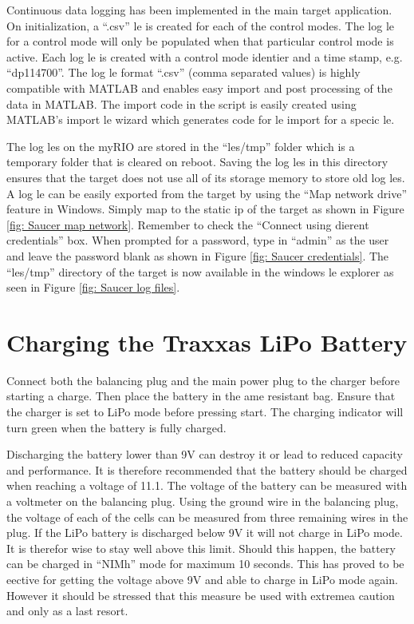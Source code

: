 \documentclass[a4paper,twoside,english]{report}
\begin{document}
Continuous data logging has been implemented in the main target application.
On initialization, a ``.csv'' le is created for each of the control
modes. The log le for a control mode will only be populated when that
particular control mode is active. Each log le is created with a control
mode identier and a time stamp, e.g. ``dp114700''. The log le format
``.csv'' (comma separated values) is highly compatible with MATLAB
and enables easy import and post processing of the data in MATLAB.
The import code in the script is easily created using MATLAB's import
le wizard which generates code for le import for a specic le.

The log les on the myRIO are stored in the ``les/tmp'' folder which
is a temporary folder that is cleared on reboot. Saving the log les
in this directory ensures that the target does not use all of its
storage memory to store old log les. A log le can be easily exported
from the target by using the ``Map network drive'' feature in Windows.
Simply map to the static ip of the target as shown in Figure \ref{fig: Saucer map network}.
Remember to check the ``Connect using dierent credentials'' box.
When prompted for a password, type in ``admin'' as the user and
leave the password blank as shown in Figure \ref{fig: Saucer credentials}.
The ``les/tmp'' directory of the target is now available in the
windows le explorer as seen in Figure \ref{fig: Saucer log files}.

\section{Charging the Traxxas LiPo Battery}

Connect both the balancing plug and the main power plug to the charger
before starting a charge. Then place the battery in the ame resistant
bag. Ensure that the charger is set to LiPo mode before pressing start.
The charging indicator will turn green when the battery is fully charged.

Discharging the battery lower than 9V can destroy it or lead to reduced
capacity and performance. It is therefore recommended that the battery
should be charged when reaching a voltage of 11.1. The voltage of
the battery can be measured with a voltmeter on the balancing plug.
Using the ground wire in the balancing plug, the voltage of each of
the cells can be measured from three remaining wires in the plug.
If the LiPo battery is discharged below 9V it will not charge in LiPo
mode. It is therefor wise to stay well above this limit. Should this
happen, the battery can be charged in ``NIMh'' mode for maximum
10 seconds. This has proved to be eective for getting the voltage
above 9V and able to charge in LiPo mode again. However it should
be stressed that this measure be used with extremea caution and only
as a last resort.
\end{document}

